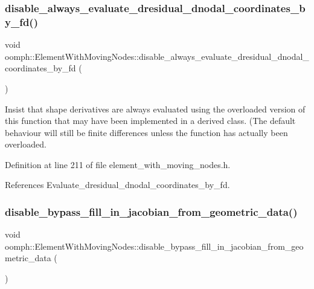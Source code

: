 \subsubsection{\texorpdfstring{disable\+\_\+always\+\_\+evaluate\+\_\+dresidual\+\_\+dnodal\+\_\+coordinates\+\_\+by\+\_\+fd()}{disable\_always\_evaluate\_dresidual\_dnodal\_coordinates\_by\_fd()}}
{\footnotesize\ttfamily void oomph\+::\+Element\+With\+Moving\+Nodes\+::disable\+\_\+always\+\_\+evaluate\+\_\+dresidual\+\_\+dnodal\+\_\+coordinates\+\_\+by\+\_\+fd (\begin{DoxyParamCaption}{ }\end{DoxyParamCaption})\hspace{0.3cm}{\ttfamily [inline]}}



Insist that shape derivatives are always evaluated using the overloaded version of this function that may have been implemented in a derived class. (The default behaviour will still be finite differences unless the function has actually been overloaded. 



Definition at line 211 of file element\+\_\+with\+\_\+moving\+\_\+nodes.\+h.



References Evaluate\+\_\+dresidual\+\_\+dnodal\+\_\+coordinates\+\_\+by\+\_\+fd.

\mbox{\label{classoomph_1_1ElementWithMovingNodes_a4f1d999320dd5bbece88b33241816e9e}} 
\subsubsection{\texorpdfstring{disable\+\_\+bypass\+\_\+fill\+\_\+in\+\_\+jacobian\+\_\+from\+\_\+geometric\+\_\+data()}{disable\_bypass\_fill\_in\_jacobian\_from\_geometric\_data()}}
{\footnotesize\ttfamily void oomph\+::\+Element\+With\+Moving\+Nodes\+::disable\+\_\+bypass\+\_\+fill\+\_\+in\+\_\+jacobian\+\_\+from\+\_\+geometric\+\_\+data (\begin{DoxyParamCaption}{ }\end{DoxyParamCaption})\hspace{0.3cm}{\ttfamily [inline]}}



